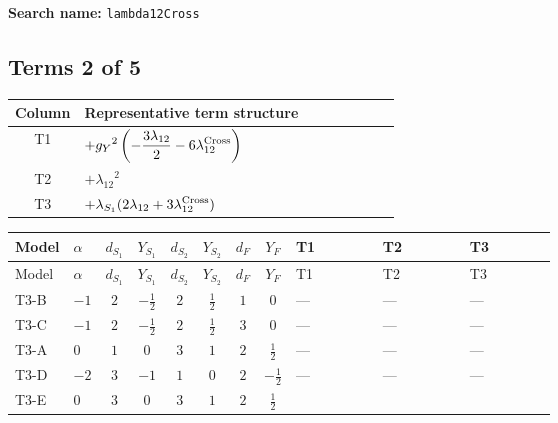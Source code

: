 \documentclass[8pt]{article}
\begin{document}
\begin{landscape}
\begin{longtable}{@{}llcccccc >{\raggedright\arraybackslash}p{0.21\linewidth} >{\raggedright\arraybackslash}p{0.21\linewidth} >{\raggedright\arraybackslash}p{0.21\linewidth}@{}}
\midrule
\bottomrule
\end{longtable}
\clearpage
\noindent\textbf{Search name: }\texttt{lambda12Cross}\par\smallskip
\subsection*{Terms 2 of 5}
\begin{center}
\begin{tabular}{@{}c >{\raggedright\arraybackslash}p{0.82\linewidth}@{}}
\toprule
Column & Representative term structure \\
\midrule
T1 & \(\displaystyle +{g_Y}^2 \left(-\frac{3 {\lambda_{12}}}{2}-6 {\lambda_{12}^{\rm Cross}}\right)\) \\
\midrule
T2 & \(\displaystyle +{\lambda_{12}}^2\) \\
\midrule
T3 & \(\displaystyle +{\lambda_{S_1}} (2 {\lambda_{12}}+3 {\lambda_{12}^{\rm Cross}})\) \\
\midrule
\bottomrule
\end{tabular}
\end{center}
\smallskip
\tiny
\begin{longtable}{@{}llcccccc >{\raggedright\arraybackslash}p{0.21\linewidth} >{\raggedright\arraybackslash}p{0.21\linewidth} >{\raggedright\arraybackslash}p{0.21\linewidth}@{}}
\toprule
Model & $\alpha$ & $d_{S_1}$ & $Y_{S_1}$ & $d_{S_2}$ & $Y_{S_2}$ & $d_F$ & $Y_F$ & T1 & T2 & T3 \\
\midrule
\endfirsthead
\toprule
Model & $\alpha$ & $d_{S_1}$ & $Y_{S_1}$ & $d_{S_2}$ & $Y_{S_2}$ & $d_F$ & $Y_F$ & T1 & T2 & T3 \\
\midrule
\endhead
T3-B & $-1$ & $2$ & $-\frac{1}{2}$ & $2$ & $\frac{1}{2}$ & $1$ & $0$ & --- & --- & --- \\
\midrule
T3-C & $-1$ & $2$ & $-\frac{1}{2}$ & $2$ & $\frac{1}{2}$ & $3$ & $0$ & --- & --- & --- \\
\midrule
T3-A & $0$ & $1$ & $0$ & $3$ & $1$ & $2$ & $\frac{1}{2}$ & --- & --- & --- \\
\midrule
T3-D & $-2$ & $3$ & $-1$ & $1$ & $0$ & $2$ & $-\frac{1}{2}$ & --- & --- & --- \\
\midrule
T3-E & $0$ & $3$ & $0$ & $3$ & $1$ & $2$ & $\frac{1}{2}$ & \scriptsize\adjustbox{max width=\linewidth}{$\begin{gathered} +{g_Y}^2 \left(-\frac{3 {\lambda_{12}}}{2}-6 {\lambda_{12}^{\rm Cross}}\right)\end{gathered}$} & \scriptsize\adjustbox{max width=\linewidth}{$\begin{gathered} +{\lambda_{12}}^2\end{gathered}$} & \scriptsize\adjustbox{max width=\linewidth}{$\begin{gathered} +{\lambda_{S_1}} (2 {\lambda_{12}}+3 {\lambda_{12}^{\rm Cross}})\end{gathered}$} \\

\end{longtable}
\end{landscape}
\end{document}

